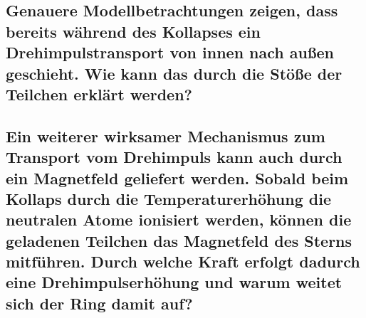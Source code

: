 \documentclass[12pt]{article}
\begin{document}
	\subsection{Genauere Modellbetrachtungen zeigen, dass bereits während des Kollapses ein Drehimpulstransport von innen nach außen geschieht. Wie kann das durch die Stöße der Teilchen erklärt werden?}
	
	\subsection{Ein weiterer wirksamer Mechanismus zum Transport vom Drehimpuls kann auch durch ein Magnetfeld geliefert werden. Sobald beim Kollaps durch die Temperaturerhöhung die neutralen Atome ionisiert werden, können die geladenen Teilchen das Magnetfeld des Sterns mitführen. Durch welche Kraft erfolgt dadurch eine Drehimpulserhöhung und warum weitet sich der Ring damit auf?}
\end{document}

